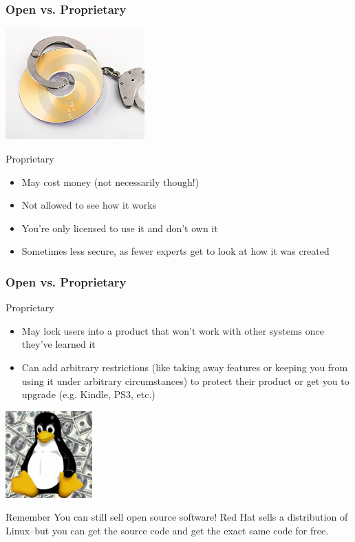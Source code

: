 \documentclass{beamer}
\begin{document}
\begin{frame}
  \frametitle{Open vs. Proprietary}
  \begin{center}\includegraphics[width=0.4\textwidth]{img/proprietary}\end{center}  \begin{Large} Proprietary \end{Large}
  \begin{itemize}
  \item May cost \textcolor{beamer@mygreen}{money} (not necessarily though!)
  \item \textcolor{beamer@mygreen}{Not} allowed to see how it works
  \item You're only \textcolor{beamer@mygreen}{licensed} to use it and don't own it
  \item Sometimes less \textcolor{beamer@mygreen}{secure}, as fewer experts get to look at how it was created

  \end{itemize}

\end{frame}

\begin{frame}
  \frametitle{Open vs. Proprietary}
  \begin{Large} Proprietary \end{Large}
  \begin{itemize}
  \item May \textcolor{beamer@mygreen}{lock} users into a product that won't work with other systems once they've learned it
    
  \item Can add arbitrary \textcolor{beamer@mygreen}{restrictions} (like taking away features or keeping you from using it under arbitrary circumstances) to protect their product or get you to upgrade (e.g. Kindle, PS3, etc.)
  \end{itemize}

  \begin{center}\includegraphics[width=0.25\textwidth]{img/tuxmoney}\end{center}
  \begin{block}{Remember}
    You can still sell open source software! Red Hat sells a distribution of Linux--but you can get the source code and get the exact same code for free.
  \end{block}
\end{frame}
\end{document}
